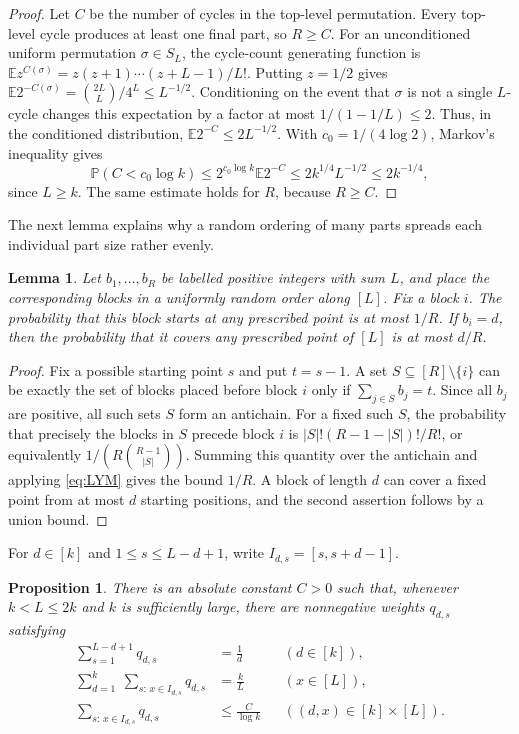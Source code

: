 \documentclass[10pt,a4paper]{amsart}
\numberwithin{equation}{section}
\newtheorem{lemma}[theorem]{Lemma}
\newtheorem{proposition}[theorem]{Proposition}
\newcommand{\E}{\mathbb{E}}
\newcommand{\Prob}{\mathbb{P}}
\begin{document}
\begin{proof}
Let $C$ be the number of cycles in the top-level permutation.  Every top-level
cycle produces at least one final part, so $R\ge C$.  For an unconditioned
uniform permutation $\sigma\in S_L$, the cycle-count generating function is
$\E z^{C(\sigma)}=z(z+1)\cdots(z+L-1)/L!$.  Putting $z=1/2$ gives $\E 2^{-C(\sigma)}=\binom{2L}{L}/4^L\le L^{-1/2}$.
Conditioning on the event that $\sigma$ is not a single $L$-cycle changes this
expectation by a factor at most $1/(1-1/L)\le2$.  Thus, in the conditioned
distribution, $\E 2^{-C}\le2L^{-1/2}$.  With $c_0=1/(4\log2)$, Markov's
inequality gives
\[
 \Prob(C<c_0\log k)
 \le 2^{c_0\log k}\E 2^{-C}
 \le 2k^{1/4}L^{-1/2}
 \le 2k^{-1/4},
\]
since $L\ge k$.  The same estimate holds for $R$, because $R\ge C$.
\end{proof}

The next lemma explains why a random ordering of many parts spreads each
individual part size rather evenly.

\begin{lemma}\label{lem:start-position}
Let $b_1,\ldots,b_R$ be labelled positive integers with sum $L$, and place the
corresponding blocks in a uniformly random order along $[L]$.  Fix a block
$i$.  The probability that this block starts at any prescribed point is at
most $1/R$.  If $b_i=d$, then the probability that it covers any prescribed
point of $[L]$ is at most $d/R$.
\end{lemma}

\begin{proof}
Fix a possible starting point $s$ and put $t=s-1$.  A set
$S\subseteq[R]\setminus\{i\}$ can be exactly the set of blocks placed before
block $i$ only if $\sum_{j\in S}b_j=t$.  Since all $b_j$ are positive, all such
sets $S$ form an antichain.  For a fixed such $S$, the probability that
precisely the blocks in $S$ precede block $i$ is
$|S|!(R-1-|S|)!/R!$, or equivalently $1/(R\binom{R-1}{|S|})$.  Summing this
quantity over the antichain and applying \eqref{eq:LYM} gives the bound
$1/R$.  A block of length $d$ can cover a fixed point from at most $d$ starting
positions, and the second assertion follows by a union bound.
\end{proof}

For $d\in[k]$ and $1\le s\le L-d+1$, write $I_{d,s}=[s,s+d-1]$.

\begin{proposition}\label{prop:fractional-interval}
There is an absolute constant $C>0$ such that, whenever $k<L\le2k$ and $k$ is
sufficiently large, there are nonnegative weights $q_{d,s}$ satisfying
\begin{align}
 \sum_{s=1}^{L-d+1}q_{d,s}&=\frac1d
        &&(d\in[k]),\label{eq:q-color}\\
 \sum_{d=1}^k\ \sum_{s:\,x\in I_{d,s}}q_{d,s}&=\frac{k}{L}
        &&(x\in[L]),\label{eq:q-load}\\
 \sum_{s:\,x\in I_{d,s}}q_{d,s}&\le\frac{C}{\log k}
        &&((d,x)\in[k]\times[L]).\label{eq:q-diffuse}
\end{align}
\end{proposition}
\end{document}

